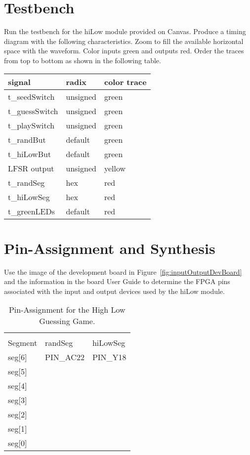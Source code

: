 \section{Testbench}

  Run the testbench for the hiLow module provided on Canvas. Produce a
  timing diagram with the following characteristics. Zoom to fill the
  available horizontal space with the waveform. Color inputs green and
  outputs red. Order the traces from top to bottom as shown in the 
  \hypertarget{hlgg:signalColor}{following table}.

\begin{tabular}{p{4cm}p{4cm}p{4cm}}
signal & radix & color trace \\ \hline
    t\_seedSwitch & unsigned  & green  \\
    t\_guessSwitch & unsigned & green  \\
    t\_playSwitch & unsigned & green  \\
    t\_randBut & default & green  \\
    t\_hiLowBut & default & green  \\
    LFSR output & unsigned & yellow \\
    t\_randSeg & hex & red  \\
    t\_hiLowSeg & hex & red  \\
    t\_greenLEDs & default & red  \\
  \end{tabular}



\section{Pin-Assignment and Synthesis}

Use the image of the development board in 
Figure~\ref{fig:inputOutputDevBoard} and the information
in the board User Guide to determine the FPGA pins associated with the
input and output devices used by the hiLow module. 

\begin{longtable}[]{@{}
|  >{\raggedright\arraybackslash}p{}|
  >{\raggedright\arraybackslash}p{}|
  >{\raggedright\arraybackslash}p{}|@{}}
\toprule()
\caption{Pin-Assignment for the High Low Guessing Game.}
\label{table:hlggPinAssignment} \tabularnewline
Segment & randSeg & hiLowSeg \\
\midrule()
\endhead
seg{[}6{]} & PIN\_AC22 & PIN\_Y18 \\ \hline
seg{[}5{]} & & \\ \hline
seg{[}4{]} & & \\ \hline
seg{[}3{]} & & \\ \hline
seg{[}2{]} & & \\ \hline
seg{[}1{]} & & \\ \hline
seg{[}0{]} & & \\
\bottomrule()
\end{longtable}


